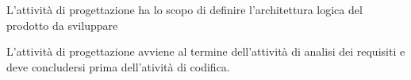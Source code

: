 L'attivit\`{a} di progettazione ha lo scopo di definire l'architettura logica del prodotto da sviluppare 

L'attivit\`{a} di progettazione avviene al termine dell'attivit\`{a} di analisi dei requisiti e deve concludersi prima dell'ativit\`{a} di codifica. 